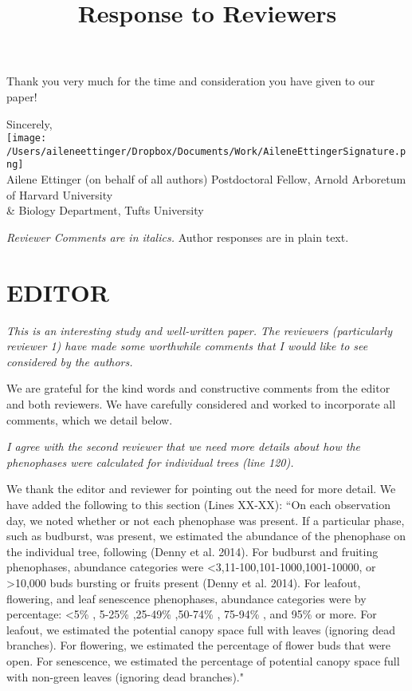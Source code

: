 \documentclass[10.95pt,a4paper]{letter}
\begin{document}
\begin{letter}{}
Thank you very much for the time and consideration you have given to our paper!

Sincerely,\\

\texttt{[image: /Users/aileneettinger/Dropbox/Documents/Work/AileneEttingerSignature.png]} \\
Ailene Ettinger (on behalf of all authors)
Postdoctoral Fellow, Arnold Arboretum of Harvard University \\ \& Biology Department, Tufts University

\end{letter}
\clearpage

\title{Response to Reviewers}
 \emph{Reviewer Comments are in italics.} Author responses are in plain text.

\section {EDITOR}
\par \emph{This is an interesting study and well-written paper.  The reviewers (particularly reviewer 1) have made some worthwhile comments that I would like to see considered by the authors.}
\par We are grateful for the kind words and constructive comments from the editor and both reviewers. We have carefully considered and worked to incorporate all comments, which we detail below.

\par \emph{I agree with the second reviewer that we need more details about how the phenophases were calculated for individual trees (line 120). }
\par We thank the editor and reviewer for pointing out the need for more detail. We have added the following to this section (Lines XX-XX): 
``On each observation day, we noted whether or not each phenophase was present. If a particular phase, such as budburst, was present, we estimated the abundance of the phenophase on the individual tree, following (Denny et al. 2014). For budburst and fruiting phenophases, abundance categories were \textless 3,11-100,101-1000,1001-10000, or \textgreater10,000 buds bursting or fruits present (Denny et al. 2014). For leafout, flowering, and leaf senescence phenophases, abundance categories were by percentage: \textless 5\% , 5-25\% ,25-49\% ,50-74\% , 75-94\% , and 95\%  or more. For leafout, we estimated the potential canopy space full with leaves (ignoring dead branches). For flowering, we estimated the percentage of flower buds that were open. For senescence, we estimated the percentage of potential canopy space full with non-green leaves (ignoring dead branches)." 
\end{document}
